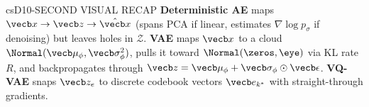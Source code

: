 \documentclass[../../../../master.tex]{subfiles}
\begin{document}
\begin{cscolumns}
\begin{cscard}{csD}{10-SECOND VISUAL RECAP}
  \sffamily\footnotesize
  \textbf{Deterministic AE} maps $\vecb x\to\vecb z\to\hat{\vecb x}$ (spans PCA if linear, estimates $\nabla\log p_\sigma$ if denoising) but leaves holes in $\mathcal Z$.
  \textbf{VAE} maps $\vecb x$ to a cloud $\Normal(\vecb\mu_\phi,\vecb\sigma_\phi^2)$, pulls it toward $\Normal(\zeros,\eye)$ via KL rate $R$, and backpropagates through $\vecb z=\vecb\mu_\phi+\vecb\sigma_\phi\odot\vecb\epsilon$.
  \textbf{VQ-VAE} snaps $\vecb z_e$ to discrete codebook vectors $\vecb e_{k^*}$ with straight-through gradients.
\end{cscard}
\end{cscolumns}

\csend
\end{document}
